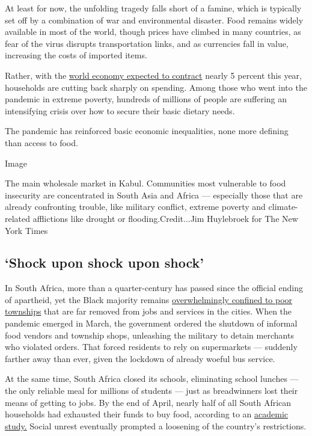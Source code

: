 At least for now, the unfolding tragedy falls short of a famine, which
is typically set off by a combination of war and environmental disaster.
Food remains widely available in most of the world, though prices have
climbed in many countries, as fear of the virus disrupts transportation
links, and as currencies fall in value, increasing the costs of imported
items.

Rather, with the
\href{https://www.imf.org/en/Publications/WEO/Issues/2020/06/24/WEOUpdateJune2020}{world
economy expected to contract} nearly 5 percent this year, households are
cutting back sharply on spending. Among those who went into the pandemic
in extreme poverty, hundreds of millions of people are suffering an
intensifying crisis over how to secure their basic dietary needs.

The pandemic has reinforced basic economic inequalities, none more
defining than access to food.

Image

The main wholesale market in Kabul. Communities most vulnerable to food
insecurity are concentrated in South Asia and Africa --- especially
those that are already confronting trouble, like military conflict,
extreme poverty and climate-related afflictions like drought or
flooding.Credit...Jim Huylebroek for The New York Times

\hypertarget{shock-upon-shock-upon-shock}{%
\subsection{`Shock upon shock upon
shock'}\label{shock-upon-shock-upon-shock}}

In South Africa, more than a quarter-century has passed since the
official ending of apartheid, yet the Black majority remains
\href{https://www.nytimes3xbfgragh.onion/2017/10/24/business/south-africa-economy-apartheid.html}{overwhelmingly
confined to poor townships} that are far removed from jobs and services
in the cities. When the pandemic emerged in March, the government
ordered the shutdown of informal food vendors and township shops,
unleashing the military to detain merchants who violated orders. That
forced residents to rely on supermarkets --- suddenly farther away than
ever, given the lockdown of already woeful bus service.

At the same time, South Africa closed its schools, eliminating school
lunches --- the only reliable meal for millions of students --- just as
breadwinners lost their means of getting to jobs. By the end of April,
nearly half of all South African households had exhausted their funds to
buy food, according to an
\href{https://cramsurvey.org/wp-content/uploads/2020/07/Wills-household-resource-flows-and-food-poverty-during-South-Africa\%E2\%80\%99s-lockdown-2.pdf}{academic
study.} Social unrest eventually prompted a loosening of the country's
restrictions.

